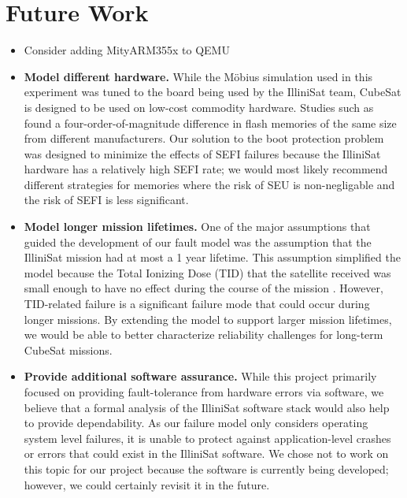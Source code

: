 \section{Future Work}\label{sec:future_work}
\begin{itemize}
  \item Consider adding MityARM355x to QEMU
  \item {\bf Model different hardware.}  While the M\"obius simulation used in this experiment was tuned to the board being used by the IlliniSat team, CubeSat is designed to be used on low-cost commodity hardware.  Studies such as \cite{Oldham2008TID} found a four-order-of-magnitude difference in flash memories of the same size from different manufacturers.  Our solution to the boot protection problem was designed to minimize the effects of SEFI failures because the IlliniSat hardware has a relatively high SEFI rate; we would most likely recommend different strategies for memories where the risk of SEU is non-negligable and the risk of SEFI is less significant.
  \item {\bf Model longer mission lifetimes.}  One of the major assumptions that guided the development of our fault model was the assumption that the IlliniSat mission had at most a 1 year lifetime.  This assumption simplified the model because the Total Ionizing Dose (TID) that the satellite received was small enough to have no effect during the course of the mission \cite{Likar2010Novel, Oldham2008TID}.  However, TID-related failure is a significant failure mode that could occur during longer missions.  By extending the model to support larger mission lifetimes, we would be able to better characterize reliability challenges for long-term CubeSat missions.
  \item {\bf Provide additional software assurance.} While this project primarily focused on providing fault-tolerance from hardware errors via software, we believe that a formal analysis of the IlliniSat software stack would also help to provide dependability.  As our failure model only considers operating system level failures, it is unable to protect against application-level crashes or errors that could exist in the IlliniSat software.  We chose not to work on this topic for our project because the software is currently being developed; however, we could certainly revisit it in the future.
\end{itemize}
